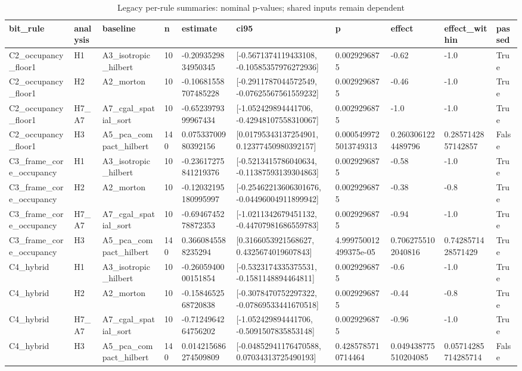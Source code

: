 \begin{table}
\caption{Legacy per-rule summaries: nominal p-values; shared inputs remain dependent}
\label{tab:synthetic\_statistics\_by\_bit\_rule}
\begin{tabular}{llllllllll}
\toprule
bit\_rule & analysis & baseline & n & estimate & ci95 & p & effect & effect\_within & passed \\
\midrule
C2\_occupancy\_floor1 & H1 & A3\_isotropic\_hilbert & 10 & -0.2093529834950345 & [-0.5671374119433108, -0.10585357976272936] & 0.0029296875 & -0.62 & -1.0 & True \\
C2\_occupancy\_floor1 & H2 & A2\_morton & 10 & -0.10681558707485228 & [-0.2911787044572549, -0.07625567561559232] & 0.0029296875 & -0.46 & -1.0 & True \\
C2\_occupancy\_floor1 & H7\_A7 & A7\_cgal\_spatial\_sort & 10 & -0.6523979399967434 & [-1.052429894441706, -0.42948107558310067] & 0.0029296875 & -1.0 & -1.0 & True \\
C2\_occupancy\_floor1 & H3 & A5\_pca\_compact\_hilbert & 140 & 0.07533700980392156 & [0.01795343137254901, 0.12377450980392157] & 0.0005499725013749313 & 0.2603061224489796 & 0.2857142857142857 & False \\
C3\_frame\_core\_occupancy & H1 & A3\_isotropic\_hilbert & 10 & -0.23617275841219376 & [-0.5213415786040634, -0.11387593139304863] & 0.0029296875 & -0.58 & -1.0 & True \\
C3\_frame\_core\_occupancy & H2 & A2\_morton & 10 & -0.12032195180995997 & [-0.25462213606301676, -0.04496004911899942] & 0.0029296875 & -0.38 & -0.8 & True \\
C3\_frame\_core\_occupancy & H7\_A7 & A7\_cgal\_spatial\_sort & 10 & -0.6946745278872353 & [-1.0211342679451132, -0.44707981686559783] & 0.0029296875 & -0.94 & -1.0 & True \\
C3\_frame\_core\_occupancy & H3 & A5\_pca\_compact\_hilbert & 140 & 0.3660845588235294 & [0.3166053921568627, 0.4325674019607843] & 4.999750012499375e-05 & 0.7062755102040816 & 0.7428571428571429 & True \\
C4\_hybrid & H1 & A3\_isotropic\_hilbert & 10 & -0.2605940000151854 & [-0.5323174335375531, -0.1581148894464811] & 0.0029296875 & -0.6 & -1.0 & True \\
C4\_hybrid & H2 & A2\_morton & 10 & -0.1584652568720838 & [-0.3078470752297322, -0.07869533441670518] & 0.0029296875 & -0.44 & -0.8 & True \\
C4\_hybrid & H7\_A7 & A7\_cgal\_spatial\_sort & 10 & -0.7124964264756202 & [-1.052429894441706, -0.5091507835853148] & 0.0029296875 & -0.96 & -1.0 & True \\
C4\_hybrid & H3 & A5\_pca\_compact\_hilbert & 140 & 0.014215686274509809 & [-0.04852941176470588, 0.07034313725490193] & 0.4285785710714464 & 0.049438775510204085 & 0.05714285714285714 & False \\
\bottomrule
\end{tabular}
\end{table}

